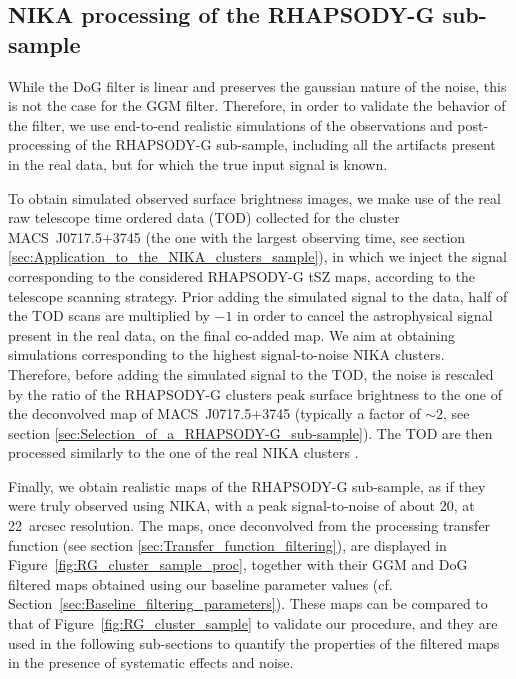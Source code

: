 \documentclass[twocolumn,traditabstract]{aa}
\begin{document}
\subsection{NIKA processing of the RHAPSODY-G sub-sample}
While the DoG filter is linear and preserves the gaussian nature of the noise, this is not the case for the GGM filter. Therefore, in order to validate the behavior of the filter, we use end-to-end realistic simulations of the observations and post-processing of the RHAPSODY-G sub-sample, including all the artifacts present in the real data, but for which the true input signal is known.

To obtain simulated observed surface brightness images, we make use of the real raw telescope time ordered data (TOD) collected for the cluster \mbox{MACS~J0717.5+3745} (the one with the largest observing time, see section \ref{sec:Application_to_the_NIKA_clusters_sample}), in which we inject the signal corresponding to the considered RHAPSODY-G tSZ maps, according to the telescope scanning strategy. Prior adding the simulated signal to the data, half of the TOD scans are multiplied by $-1$ in order to cancel the astrophysical signal present in the real data, on the final co-added map. We aim at obtaining simulations corresponding to the highest signal-to-noise NIKA clusters. Therefore, before adding the simulated signal to the TOD, the noise is rescaled by the ratio of the RHAPSODY-G clusters peak surface brightness to the one of the deconvolved map of \mbox{MACS~J0717.5+3745} (typically a factor of $\sim 2$, see section \ref{sec:Selection_of_a_RHAPSODY-G_sub-sample}). The TOD are then processed similarly to the one of the real NIKA clusters \citep[see][for more details]{Adam2015}. 

Finally, we obtain realistic maps of the RHAPSODY-G sub-sample, as if they were truly observed using NIKA, with a peak signal-to-noise of about 20, at 22~arcsec resolution. The maps, once deconvolved from the processing transfer function (see section \ref{sec:Transfer_function_filtering}), are displayed in Figure~\ref{fig:RG_cluster_sample_proc}, together with their GGM and DoG filtered maps obtained using our baseline parameter values (cf. Section~\ref{sec:Baseline_filtering_parameters}). These maps can be compared to that of Figure~\ref{fig:RG_cluster_sample} to validate our procedure, and they are used in the following sub-sections to quantify the properties of the filtered maps in the presence of systematic effects and noise.
\end{document}
